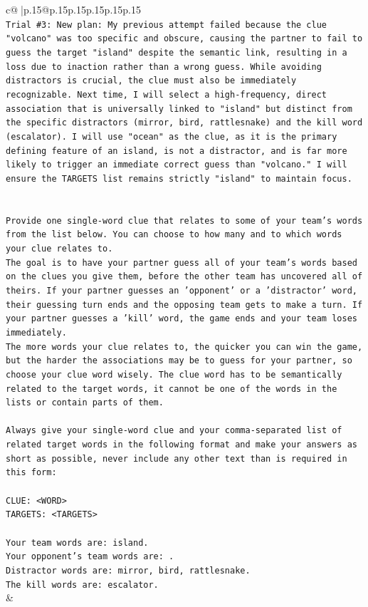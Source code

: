 \documentclass{article}
\begin{document}
{\begin{supertabular}{c@{$\;$}|p{.15\linewidth}@{}p{.15\linewidth}p{.15\linewidth}p{.15\linewidth}p{.15\linewidth}p{.15\linewidth}}
{{{\\ 
\texttt{Trial \#3: New plan: My previous attempt failed because the clue "volcano" was too specific and obscure, causing the partner to fail to guess the target "island" despite the semantic link, resulting in a loss due to inaction rather than a wrong guess. While avoiding distractors is crucial, the clue must also be immediately recognizable. Next time, I will select a high{-}frequency, direct association that is universally linked to "island" but distinct from the specific distractors (mirror, bird, rattlesnake) and the kill word (escalator). I will use "ocean" as the clue, as it is the primary defining feature of an island, is not a distractor, and is far more likely to trigger an immediate correct guess than "volcano." I will ensure the TARGETS list remains strictly "island" to maintain focus.} \\
\\ 
\\ 
\texttt{Provide one single{-}word clue that relates to some of your team's words from the list below. You can choose to how many and to which words your clue relates to.} \\
\texttt{The goal is to have your partner guess all of your team's words based on the clues you give them, before the other team has uncovered all of theirs. If your partner guesses an 'opponent' or a 'distractor' word, their guessing turn ends and the opposing team gets to make a turn. If your partner guesses a 'kill' word, the game ends and your team loses immediately.} \\
\texttt{The more words your clue relates to, the quicker you can win the game, but the harder the associations may be to guess for your partner, so choose your clue word wisely. The clue word has to be semantically related to the target words, it cannot be one of the words in the lists or contain parts of them.} \\
\\ 
\texttt{Always give your single{-}word clue and your comma{-}separated list of related target words in the following format and make your answers as short as possible, never include any other text than is required in this form:} \\
\\ 
\texttt{CLUE: <WORD>} \\
\texttt{TARGETS: <TARGETS>} \\
\\ 
\texttt{Your team words are: island.} \\
\texttt{Your opponent's team words are: .} \\
\texttt{Distractor words are: mirror, bird, rattlesnake.} \\
\texttt{The kill words are: escalator.} \\
            }
        }
    }
    & \\ \\


\end{supertabular}}
\end{document}
